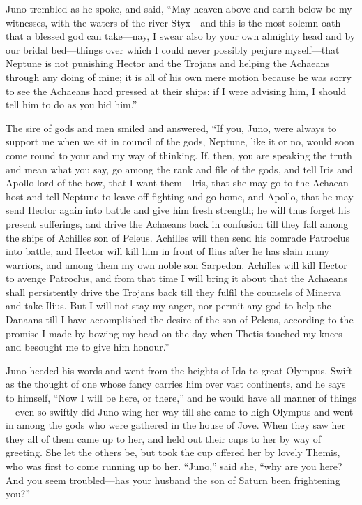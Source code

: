 Juno trembled as he spoke, and said, “May heaven above and earth below be
my witnesses, with the waters of the river Styx—and this is the most
solemn oath that a blessed god can take—nay, I swear also by your
own almighty head and by our bridal bed—things over which I could
never possibly perjure myself—that Neptune is not punishing Hector
and the Trojans and helping the Achaeans through any doing of mine; it is
all of his own mere motion because he was sorry to see the Achaeans hard
pressed at their ships: if I were advising him, I should tell him to do as
you bid him.”

The sire of gods and men smiled and answered, “If you, Juno, were always
to support me when we sit in council of the gods, Neptune, like it or no,
would soon come round to your and my way of thinking. If, then, you are
speaking the truth and mean what you say, go among the rank and file of
the gods, and tell Iris and Apollo lord of the bow, that I want them—Iris,
that she may go to the Achaean host and tell Neptune to leave off fighting
and go home, and Apollo, that he may send Hector again into battle and
give him fresh strength; he will thus forget his present sufferings, and
drive the Achaeans back in confusion till they fall among the ships of
Achilles son of Peleus. Achilles will then send his comrade Patroclus into
battle, and Hector will kill him in front of Ilius after he has slain many
warriors, and among them my own noble son Sarpedon. Achilles will kill
Hector to avenge Patroclus, and from that time I will bring it about that
the Achaeans shall persistently drive the Trojans back till they fulfil
the counsels of Minerva and take Ilius. But I will not stay my anger, nor
permit any god to help the Danaans till I have accomplished the desire of
the son of Peleus, according to the promise I made by bowing my head on
the day when Thetis touched my knees and besought me to give him honour.”

Juno heeded his words and went from the heights of Ida to great Olympus.
Swift as the thought of one whose fancy carries him over vast continents,
and he says to himself, “Now I will be here, or there,” and he would have
all manner of things—even so swiftly did Juno wing her way till she
came to high Olympus and went in among the gods who were gathered in the
house of Jove. When they saw her they all of them came up to her, and held
out their cups to her by way of greeting. She let the others be, but took
the cup offered her by lovely Themis, who was first to come running up to
her. “Juno,” said she, “why are you here? And you seem troubled—has
your husband the son of Saturn been frightening you?”

